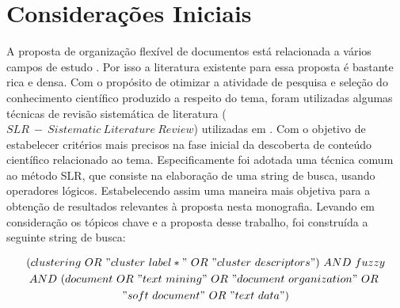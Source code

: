 %


\section{Considerações Iniciais}

A proposta de organização flexível de documentos está relacionada a vários campos de estudo
. Por isso a literatura existente para essa proposta é
bastante rica e densa. Com o propósito de otimizar a atividade de pesquisa e seleção do
conhecimento científico produzido a respeito do tema, foram utilizadas algumas técnicas de revisão
sistemática de literatura ($SLR\ -\ Sistematic\ Literature\ Review$) utilizadas em \cite{Rios2010}.
Com o objetivo de estabelecer critérios mais precisos na fase inicial da descoberta de conteúdo
científico relacionado ao tema. Especificamente foi adotada uma técnica comum ao método SLR, que consiste na
elaboração de uma string de busca, usando operadores lógicos. Estabelecendo assim uma maneira
mais objetiva para a obtenção de resultados relevantes à proposta nesta monografia. 
Levando em consideração os tópicos chave e a proposta desse trabalho, foi construída a seguinte
string de busca: 

\begin{multline} (clustering\ OR\ "cluster\ label*"\ OR\ "cluster\ descriptors")\ AND\ fuzzy \\ AND\
  (document\ OR\ "text\ mining"\ OR\ "document\ organization"\ OR\ \\ "soft\ document"\ OR\ "text\
data") \label{eq:busca} \end{multline}

